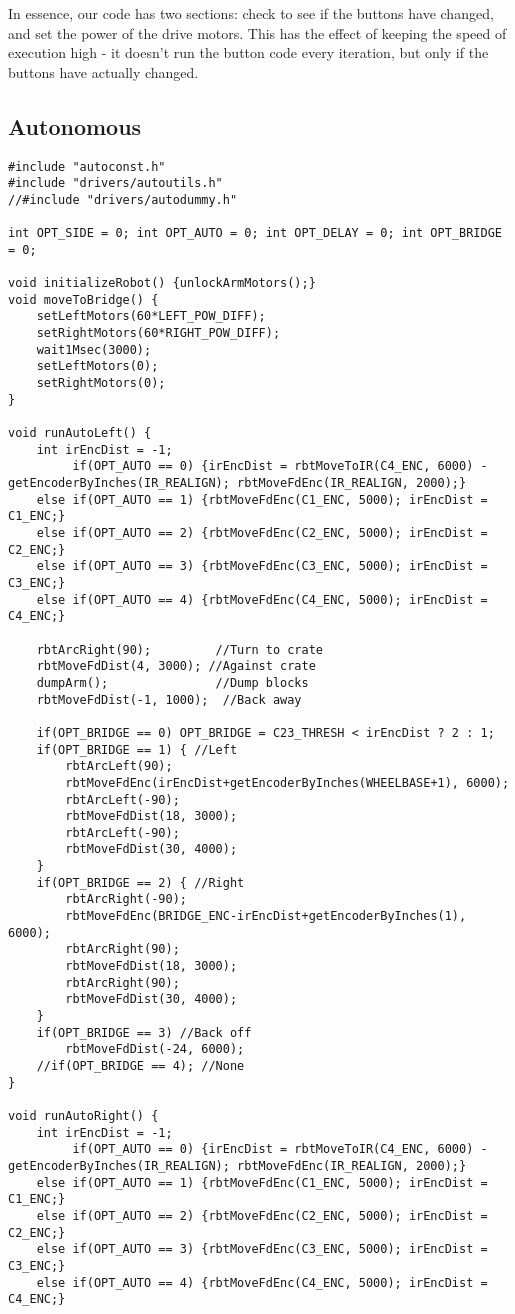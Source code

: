 In essence, our code has two sections: check to see if the buttons have changed, and set the power of the drive motors. This has the effect of keeping the speed of execution high - it doesn't run the button code every iteration, but only if the buttons have actually changed.

\subsection{Autonomous}
\begin{lstlisting}
#include "autoconst.h"
#include "drivers/autoutils.h"
//#include "drivers/autodummy.h"

int OPT_SIDE = 0; int OPT_AUTO = 0; int OPT_DELAY = 0; int OPT_BRIDGE = 0;

void initializeRobot() {unlockArmMotors();}
void moveToBridge() {
	setLeftMotors(60*LEFT_POW_DIFF);
	setRightMotors(60*RIGHT_POW_DIFF);
	wait1Msec(3000);
	setLeftMotors(0);
	setRightMotors(0);
}

void runAutoLeft() {
	int irEncDist = -1;
	     if(OPT_AUTO == 0) {irEncDist = rbtMoveToIR(C4_ENC, 6000) - getEncoderByInches(IR_REALIGN); rbtMoveFdEnc(IR_REALIGN, 2000);}
	else if(OPT_AUTO == 1) {rbtMoveFdEnc(C1_ENC, 5000); irEncDist = C1_ENC;}
	else if(OPT_AUTO == 2) {rbtMoveFdEnc(C2_ENC, 5000); irEncDist = C2_ENC;}
	else if(OPT_AUTO == 3) {rbtMoveFdEnc(C3_ENC, 5000); irEncDist = C3_ENC;}
	else if(OPT_AUTO == 4) {rbtMoveFdEnc(C4_ENC, 5000); irEncDist = C4_ENC;}

	rbtArcRight(90);         //Turn to crate
	rbtMoveFdDist(4, 3000); //Against crate
	dumpArm();               //Dump blocks
	rbtMoveFdDist(-1, 1000);  //Back away

	if(OPT_BRIDGE == 0) OPT_BRIDGE = C23_THRESH < irEncDist ? 2 : 1;
	if(OPT_BRIDGE == 1) { //Left
		rbtArcLeft(90);
		rbtMoveFdEnc(irEncDist+getEncoderByInches(WHEELBASE+1), 6000);
		rbtArcLeft(-90);
		rbtMoveFdDist(18, 3000);
		rbtArcLeft(-90);
		rbtMoveFdDist(30, 4000);
	}
	if(OPT_BRIDGE == 2) { //Right
		rbtArcRight(-90);
		rbtMoveFdEnc(BRIDGE_ENC-irEncDist+getEncoderByInches(1), 6000);
		rbtArcRight(90);
		rbtMoveFdDist(18, 3000);
		rbtArcRight(90);
		rbtMoveFdDist(30, 4000);
	}
	if(OPT_BRIDGE == 3) //Back off
		rbtMoveFdDist(-24, 6000);
	//if(OPT_BRIDGE == 4); //None
}

void runAutoRight() {
	int irEncDist = -1;
	     if(OPT_AUTO == 0) {irEncDist = rbtMoveToIR(C4_ENC, 6000) - getEncoderByInches(IR_REALIGN); rbtMoveFdEnc(IR_REALIGN, 2000);}
	else if(OPT_AUTO == 1) {rbtMoveFdEnc(C1_ENC, 5000); irEncDist = C1_ENC;}
	else if(OPT_AUTO == 2) {rbtMoveFdEnc(C2_ENC, 5000); irEncDist = C2_ENC;}
	else if(OPT_AUTO == 3) {rbtMoveFdEnc(C3_ENC, 5000); irEncDist = C3_ENC;}
	else if(OPT_AUTO == 4) {rbtMoveFdEnc(C4_ENC, 5000); irEncDist = C4_ENC;}


\end{lstlisting}
